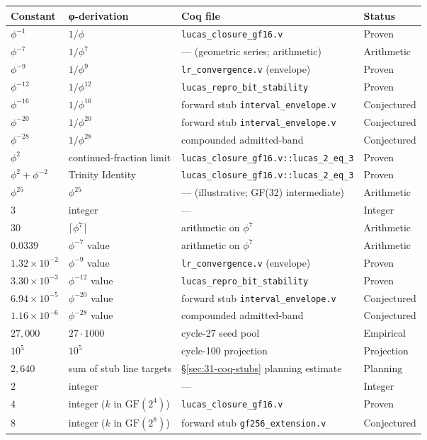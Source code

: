 \begin{center}
\begin{tabular}{|l|l|l|l|}
\hline
\textbf{Constant} & \textbf{φ-derivation} & \textbf{Coq file} & \textbf{Status} \\
\hline
$\phi^{-1}$ & $1/\phi$ & \texttt{lucas\_closure\_gf16.v} & Proven \\
$\phi^{-7}$ & $1/\phi^{7}$ & — (geometric series; arithmetic) & Arithmetic \\
$\phi^{-9}$ & $1/\phi^{9}$ & \texttt{lr\_convergence.v} (envelope) & Proven \\
$\phi^{-12}$ & $1/\phi^{12}$ & \texttt{lucas\_repro\_bit\_stability} & Proven \\
$\phi^{-16}$ & $1/\phi^{16}$ & forward stub \texttt{interval\_envelope.v} & Conjectured \\
$\phi^{-20}$ & $1/\phi^{20}$ & forward stub \texttt{interval\_envelope.v} & Conjectured \\
$\phi^{-28}$ & $1/\phi^{28}$ & compounded admitted-band & Conjectured \\
$\phi^{2}$ & continued-fraction limit & \texttt{lucas\_closure\_gf16.v::lucas\_2\_eq\_3} & Proven \\
$\phi^{2} + \phi^{-2}$ & Trinity Identity & \texttt{lucas\_closure\_gf16.v::lucas\_2\_eq\_3} & Proven \\
$\phi^{25}$ & $\phi^{25}$ & — (illustrative; GF(32) intermediate) & Arithmetic \\
$3$ & integer & — & Integer \\
$30$ & $\lceil \phi^{7} \rceil$ & arithmetic on $\phi^{7}$ & Arithmetic \\
$0.0339$ & $\phi^{-7}$ value & arithmetic on $\phi^{7}$ & Arithmetic \\
$1.32 \times 10^{-2}$ & $\phi^{-9}$ value & \texttt{lr\_convergence.v} (envelope) & Proven \\
$3.30 \times 10^{-3}$ & $\phi^{-12}$ value & \texttt{lucas\_repro\_bit\_stability} & Proven \\
$6.94 \times 10^{-5}$ & $\phi^{-20}$ value & forward stub \texttt{interval\_envelope.v} & Conjectured \\
$1.16 \times 10^{-6}$ & $\phi^{-28}$ value & compounded admitted-band & Conjectured \\
$27{,}000$ & $27 \cdot 1000$ & cycle-27 seed pool & Empirical \\
$10^{5}$ & $10^{5}$ & cycle-100 projection & Projection \\
$2{,}640$ & sum of stub line targets & §\ref{sec:31-coq-stubs} planning estimate & Planning \\
$2$ & integer & — & Integer \\
$4$ & integer ($k$ in $\mathrm{GF}(2^{4})$) & \texttt{lucas\_closure\_gf16.v} & Proven \\
$8$ & integer ($k$ in $\mathrm{GF}(2^{8})$) & forward stub \texttt{gf256\_extension.v} & Conjectured \\
\hline
\end{tabular}
\end{center}

